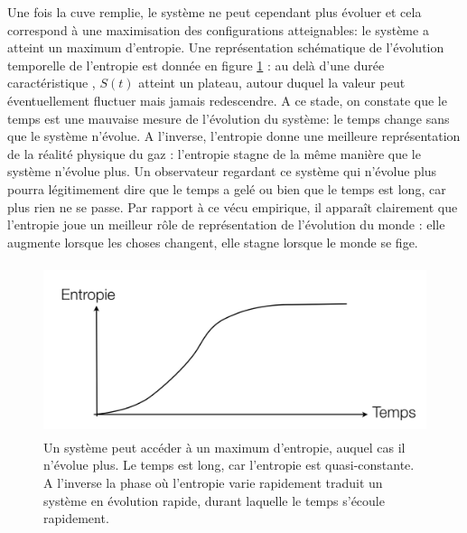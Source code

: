 Une fois la cuve remplie, le système ne peut cependant plus évoluer et cela correspond à une maximisation des configurations atteignables: le système a atteint un maximum d'entropie. Une représentation schématique de l'évolution temporelle de l'entropie est donnée en figure \ref{f:equitemps} : au delà d'une durée caractéristique , $S(t)$ atteint un plateau, autour duquel la valeur peut éventuellement fluctuer mais jamais redescendre. A ce stade, on constate que le temps est une mauvaise mesure de l'évolution du système: le temps change sans que le système n'évolue. A l'inverse, l'entropie donne une meilleure représentation de la réalité physique du gaz : l'entropie stagne de la même manière que le système n'évolue plus. Un observateur regardant ce système qui n'évolue plus pourra légitimement dire que le temps a gelé ou bien que le temps est long, car plus rien ne se passe. Par rapport à ce vécu empirique, il apparaît clairement que l'entropie joue un meilleur rôle de représentation de l'évolution du monde : elle augmente lorsque les choses changent, elle stagne lorsque le monde se fige. 
\begin{figure}[htbp]
	\centering
		\includegraphics[height=5cm]{figs/equientro.png}
	\caption[Evolution vers un maximum d'entropie]{Un système peut accéder à un maximum d'entropie, auquel cas il n'évolue plus. Le temps est long, car l'entropie est quasi-constante. A l'inverse la phase où l'entropie varie rapidement traduit un système en évolution rapide, durant laquelle le temps s'écoule rapidement.}
	\label{f:equitemps}
\end{figure}

